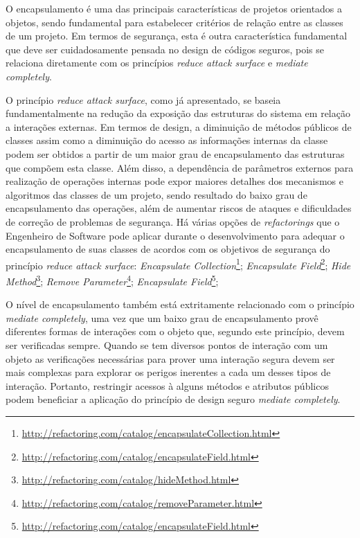 %

O encapsulamento é uma das principais características de projetos orientados a objetos, sendo fundamental para estabelecer critérios de relação entre as classes de um projeto. Em termos de segurança, esta é outra característica fundamental que deve ser cuidadosamente pensada no design de códigos seguros, pois se relaciona diretamente com os princípios \emph{reduce attack surface} e \emph{mediate completely}.

%

O princípio \emph{reduce attack surface}, como já apresentado, se baseia fundamentalmente na redução da exposição das estruturas do sistema em relação a interações externas. Em termos de design, a diminuição de métodos públicos de classes assim como a diminuição do acesso as informações internas da classe podem ser obtidos a partir de um maior grau de encapsulamento das estruturas que compõem esta classe. Além disso, a dependência de parâmetros externos para realização de operações internas pode expor maiores detalhes dos mecanismos e algoritmos das classes de um projeto, sendo resultado do baixo grau de encapsulamento das operações, além de aumentar riscos de ataques e dificuldades de correção de problemas de segurança. Há várias opções de \emph{refactorings} que o Engenheiro de Software pode aplicar durante o desenvolvimento para adequar o encapsulamento de suas classes de acordos com os objetivos de segurança do princípio \emph{reduce attack surface}: \emph{Encapsulate Collection}\footnote{\url{http://refactoring.com/catalog/encapsulateCollection.html}}; \emph{Encapsulate Field}\footnote{\url{http://refactoring.com/catalog/encapsulateField.html}}; \emph{Hide Method}\footnote{\url{http://refactoring.com/catalog/hideMethod.html}}; \emph{Remove Parameter}\footnote{\url{http://refactoring.com/catalog/removeParameter.html}}; \emph{Encapsulate Field}\footnote{\url{http://refactoring.com/catalog/encapsulateField.html}};

%

O nível de encapsulamento também está extritamente relacionado com o princípio \emph{mediate completely}, uma vez que um baixo grau de encapsulamento provê diferentes formas de interações com o objeto que, segundo este princípio, devem ser verificadas sempre. Quando se tem diversos pontos de interação com um objeto as verificações necessárias para prover uma interação segura devem ser mais complexas para explorar os perigos inerentes a cada um desses tipos de interação. Portanto, restringir acessos à alguns métodos e atributos públicos podem beneficiar a aplicação do princípio de design seguro \emph{mediate completely}.

